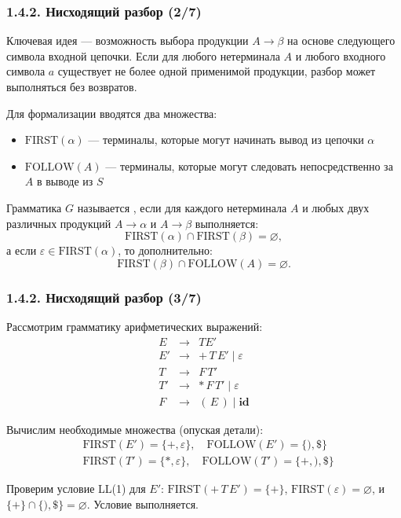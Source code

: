 \begin{frame}
\frametitle{1.4.2. Нисходящий разбор (2/7)}
Ключевая идея — возможность выбора продукции $A \to \beta$ на основе следующего символа входной цепочки. Если для любого нетерминала $A$ и любого входного символа $a$ существует не более одной применимой продукции, разбор может выполняться без возвратов.

Для формализации вводятся два множества:
\begin{itemize}
    \item $\textrm{FIRST}(\alpha)$ — терминалы, которые могут начинать вывод из цепочки $\alpha$
    \item $\textrm{FOLLOW}(A)$ — терминалы, которые могут следовать непосредственно за $A$ в выводе из $S$
\end{itemize}

Грамматика $G$ называется , если для каждого нетерминала $A$ и любых двух различных продукций $A \to \alpha$ и $A \to \beta$ выполняется:
\[
\textrm{FIRST}(\alpha) \cap \textrm{FIRST}(\beta) = \varnothing,
\]
а если $\varepsilon \in \textrm{FIRST}(\alpha)$, то дополнительно:
\[
\textrm{FIRST}(\beta) \cap \textrm{FOLLOW}(A) = \varnothing.
\]
\end{frame}

\begin{frame}
\frametitle{1.4.2. Нисходящий разбор (3/7)}
\begin{example}
Рассмотрим грамматику арифметических выражений:
\[
\begin{array}{rcl}
E & \to & T E' \\
E' & \to & +\,T\,E' \mid \varepsilon \\
T & \to & F\,T' \\
T' & \to & *\,F\,T' \mid \varepsilon \\
F & \to & (\,E\,) \mid \mathbf{id}
\end{array}
\]

Вычислим необходимые множества (опуская детали):
\begin{align*}
&\textrm{FIRST}(E') = \{ +, \varepsilon \}, \quad \textrm{FOLLOW}(E') = \{ ), \$ \} \\
&\textrm{FIRST}(T') = \{ *, \varepsilon \}, \quad \textrm{FOLLOW}(T') = \{ +, ), \$ \}
\end{align*}

Проверим условие LL(1) для $E'$: 
$\textrm{FIRST}(+\,T\,E') = \{ +\}$, 
$\textrm{FIRST}(\varepsilon) = \varnothing$,
и $\{+\} \cap \{), \$\} = \varnothing$. Условие выполняется.
\end{example}
\end{frame}

